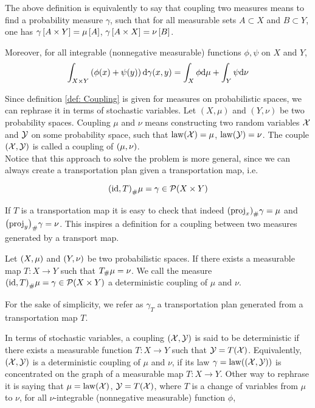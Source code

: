 The above definition is equivalently to say that coupling two measures means to find a probability measure $\gamma$, such that for all measurable sets $A\subset X$ and $B\subset Y$, one has $\gamma\left[ A\times Y \right]=\mu\left[ A \right]$, $\gamma\left[ A\times X \right]=\nu\left[ B \right]$.

Moreover, for all integrable (nonnegative measurable) functions $\phi, \psi$ on $X$ and $Y$,
\begin{equation*}
	\int_{X\times Y}\left( \phi(x)+\psi(y) \right)\mathrm{d}\gamma(x,y)=\int_{X}\phi\mathrm{d}\mu+\int_{Y}\psi\mathrm{d}\nu
\end{equation*}

Since definition \ref{def: Coupling} is given for measures on probabilistic spaces, we can rephrase it in terms of stochastic variables. Let $(X, \mu)$ and $(Y, \nu)$ be two probability spaces. Coupling $\mu$ and $\nu$ means constructing two random variables $\mathcal{X}$ and $\mathcal{Y}$ on some probability space, such that $\mathrm{law}(\mathcal{X})=\mu$, $\mathrm{law}(\mathcal{Y})=\nu$. The couple $\left( \mathcal{X},\mathcal{Y} \right)$ is called a coupling of $\left( \mu, \nu \right)$. \\

Notice that this approach to solve the problem is more general, since we can always create a transportation plan given a transportation map, i.e. 

\begin{equation*}
{(\mathrm{id}, T)}_{\#} \mu=\gamma \in \mathcal{P}(X\times Y)
\end{equation*}

If $T$ is a transportation map it is easy to check that indeed ${\left( \mathrm{proj}_x \right)}_{\#} \gamma=\mu$ and ${\left( \mathrm{proj}_y \right)}_{\#} \gamma=\nu$.  This inspires a definition for a coupling between two measures generated by a transport map. \\


\begin{definition}
Let $\left( X, \mu \right)$ and $\left( Y, \nu \right)$ be two probabilistic spaces. If there exists a measurable map $T:X\rightarrow Y$ such that ${T}_{\#} \mu=\nu$. We call the measure ${\left( \mathrm{id}, T \right)}_{\#} \mu=\gamma \in \mathcal{P}(X\times Y)$ a deterministic coupling of $\mu$ and $\nu$.
\end{definition}

For the sake of simplicity, we refer as $\gamma_T$ a transportation plan generated from a transportation map $T$.


In terms of stochastic variables, a coupling $(\mathcal{X},\mathcal{Y})$ is said to be deterministic if there exists a measurable function $T: X \rightarrow Y$ such that $\mathcal{Y} = T(\mathcal{X})$. Equivalently, $\left( \mathcal{X}, \mathcal{Y} \right)$ is a deterministic coupling of $\mu$ and $\nu$, if its law $\gamma=\mathrm{law}(\left( \mathcal{X},\mathcal{Y} \right))$ is concentrated on the graph of a measurable map $T:X\rightarrow Y$. Other way to rephrase it is saying that $\mu=\mathrm{law}(\mathcal{X})$, $\mathcal{Y}=T(\mathcal{X})$, where $T$ is a change of variables from $\mu$ to $\nu$, for all $\nu$-integrable (nonnegative measurable)  function $\phi$,


